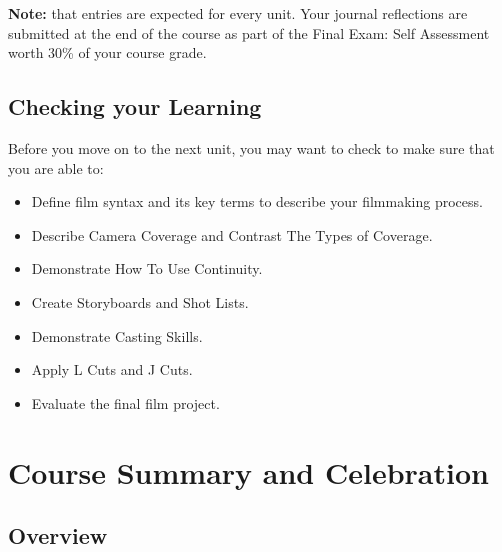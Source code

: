 \documentclass[
]{book}
\providecommand{\tightlist}{%
  \setlength{\itemsep}{0pt}\setlength{\parskip}{0pt}}
\begin{document}
\begin{caution}
\textbf{Note:} that entries are expected for every unit. Your journal reflections are submitted at the end of the course as part of the Final Exam: Self Assessment worth 30\% of your course grade.
\end{caution}

\hypertarget{checking-your-learning-8}{%
\section*{Checking your Learning}\label{checking-your-learning-8}}

\begin{progress}
Before you move on to the next unit, you may want to check to make sure that you are able to:

\begin{itemize}
\tightlist
\item
  Define film syntax and its key terms to describe your filmmaking process.\\
\item
  Describe Camera Coverage and Contrast The Types of Coverage.\\
\item
  Demonstrate How To Use Continuity.\\
\item
  Create Storyboards and Shot Lists.\\
\item
  Demonstrate Casting Skills.\\
\item
  Apply L Cuts and J Cuts.\\
\item
  Evaluate the final film project.
\end{itemize}
\end{progress}

\hypertarget{course-summary-and-celebration}{%
\chapter{Course Summary and Celebration}\label{course-summary-and-celebration}}

\hypertarget{overview-9}{%
\section*{Overview}\label{overview-9}}
\end{document}
